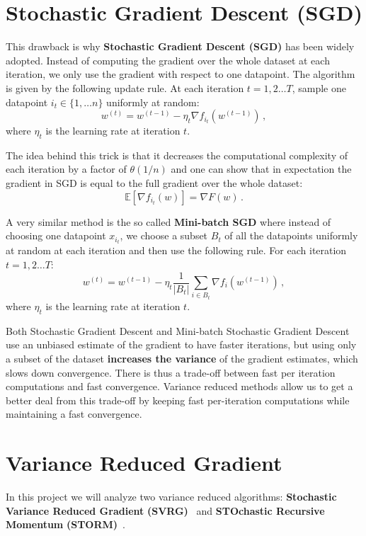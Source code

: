 \documentclass[a4paper,11pt,oneside]{report}
\begin{document}
\section{Stochastic Gradient Descent (SGD)}
This drawback is why \textbf{Stochastic Gradient Descent (SGD)} has been widely adopted. Instead of computing the gradient over the whole dataset at each iteration, we only use the gradient with respect to one datapoint. The algorithm is given by the following update rule. At each iteration $t=1,2 \dots T$, sample one datapoint $i_t \in \{1,\dots n\}$ uniformly at random:
\begin{equation}\label{eq:SGD}
    w^{(t)} = w^{(t-1)} -\eta_t \nabla f_{i_t}(w^{(t-1)})\,,
\end{equation}
where $\eta_t$ is the learning rate at iteration $t$.

The idea behind this trick is that it decreases the computational complexity of each iteration by a factor of $\theta(1/n)$ and one can show that in expectation the gradient in SGD is equal to the full gradient over the whole dataset:
\begin{equation}\label{eq:unbaisedSGD}
    \mathbb{E}[\nabla f_{i_t}(w)] = \nabla F(w)\,.
\end{equation}

A very similar method is the so called \textbf{Mini-batch SGD} where instead of choosing one datapoint $x_{i_t}$, we choose a subset $B_t$ of all the datapoints uniformly at random at each iteration and then use the following  rule. For each iteration $t = 1,2 \dots T$:
\begin{equation}\label{eq:minibatchSGD}
    w^{(t)} = w^{(t-1)} -\eta_t \frac{1}{\mathopen|B_t\mathclose|}\sum_{i \in B_t}\nabla f_{i}(w^{(t-1)})\,,
\end{equation}
where $\eta_t$ is the learning rate at iteration $t$.

Both Stochastic Gradient Descent and Mini-batch Stochastic Gradient Descent use an unbiased estimate of the gradient to have faster iterations, but using only a subset of the dataset \textbf{increases the variance} of the gradient estimates, which slows down convergence. There is thus a trade-off between fast per iteration computations and fast convergence. Variance reduced methods allow us to get a better deal from this trade-off by keeping fast per-iteration computations while maintaining a fast convergence.

\section{Variance Reduced Gradient}
In this project we will analyze two variance reduced algorithms: \textbf{Stochastic Variance Reduced Gradient} \textbf{(SVRG)}~\citep{johnson2013svrg} and \textbf{STOchastic Recursive Momentum} \textbf{(STORM)}~\citep{Cutkosky2019storm}. 
\end{document}
